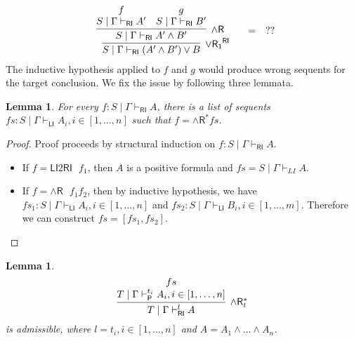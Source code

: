 \documentclass[submission,copyright,creativecommons]{eptcs}
\newtheorem{lemma}[theorem]{Lemma}
\theoremstyle{definition}
\newcommand{\andr}{\land \mathsf{R}}
\newcommand{\orrone}{\lor \mathsf{R_{1}}}
\newcommand{\RI}{\mathsf{RI}}
\newcommand{\LI}{\mathsf{LI}}
\newcommand{\Pass}{\mathsf{P}}
\newcommand{\proofbox}[1]{\begin{tabular}{l} #1 \end{tabular}}
\begin{document}
\begin{displaymath}
  \begin{array}{c}
    \proofbox{
    \infer[\orrone^{\RI}]{S \mid \Gamma \vdash_{\RI} (A' \land B') \lor B}{
      \infer[\andr]{S \mid \Gamma \vdash_{\RI} A' \land B'}{
        \deduce{S \mid \Gamma \vdash_{\RI} A'}{f}
        &
        \deduce{S \mid \Gamma \vdash_{\RI} B'}{g}
      }
    }
    }
    \quad
    =
    \quad
    ??
  \end{array}
\end{displaymath}
The inductive hypothesis applied to $f$ and $g$ would produce wrong sequents for the target conclusion.
We fix the issue by following three lemmata.
\begin{lemma}
  For every $f : S \mid \Gamma \vdash_{\RI} A$, there is a list of sequents $fs : S \mid \Gamma \vdash_{\LI} A_i, i \in [1 , \dots , n]$ such that $f = \andr^{*} fs$.
\end{lemma}
\begin{proof}
  Proof proceeds by structural induction on $f : S \mid \Gamma \vdash_{\RI} A$.
  \begin{itemize}
    \item If $f = \LI2 \RI \text{ } f_1$, then $A$ is a positive formula and $fs = S \mid \Gamma \vdash_{LI} A$.
    \item If $f = \andr \text{ } f_1 f_2$, then by inductive hypothesis, we have $fs_1 : S \mid \Gamma \vdash_{\LI} A_i, i \in [1 , \dots , n]$ and $fs_2 : S \mid \Gamma \vdash_{\LI} B_i, i \in [1 , \dots , m]$.
    Therefore we can construct $fs = [fs_1 , fs_2]$.
  \end{itemize}
\end{proof}
\begin{lemma}
  \begin{displaymath}
    \infer[\andr^{*}_t]{T \mid \Gamma \vdash^{l}_{\RI} A}{
      \deduce{T \mid \Gamma \vdash^{t_i}_{\Pass} A_i , i \in [1 , \dots , n]}{fs}
    }
  \end{displaymath}
  is admissible, where $l = t_i , i \in [1 , \dots , n]$ and $A = A_1 \land \dots \land A_n$.
\end{lemma}
\end{document}
